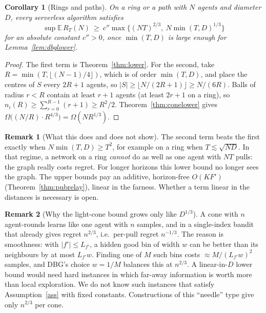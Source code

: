 \documentclass[11pt]{article}
\newtheorem{corollary}[theorem]{Corollary}
\theoremstyle{definition}
\newtheorem{remark}{Remark}
\newcommand{\E}{\mathbb{E}}
\begin{document}
\begin{corollary}[Rings and paths]\label{cor:ringlower}
On a ring or a path with $N$ agents and diameter $D$, every serverless algorithm satisfies
\[
\sup\E\,R_T(N)\ \ge\ c''\max\Big\{(NT)^{2/3},\ N\min(T,D)^{1/3}\Big\}
\]
for an absolute constant $c''>0$, once $\min(T,D)$ is large enough for Lemma~\ref{lem:dbglower}.
\end{corollary}
\begin{proof}
The first term is Theorem~\ref{thm:lower}. For the second, take $R=\min(T,\lfloor(N-1)/4\rfloor)$, which is of order
$\min(T,D)$, and place the centres of $S$ every $2R+1$ agents, so $|S|\ge\lfloor N/(2R+1)\rfloor\ge N/(6R)$. Balls of radius
$r<R$ contain at least $r+1$ agents (at least $2r+1$ on a ring), so $n_i(R)\ge\sum_{r=0}^{R-1}(r+1)\ge R^2/2$.
Theorem~\ref{thm:conelower} gives $\Omega\big((N/R)\cdot R^{4/3}\big)=\Omega(NR^{1/3})$.
\end{proof}

\begin{remark}[What this does and does not show]\label{rem:conelower}
The second term beats the first exactly when $N\min(T,D)\ge T^2$, for example on a ring when $T\lesssim\sqrt{ND}$. In
that regime, a network on a ring \emph{cannot} do as well as one agent with $NT$ pulls: the graph really costs regret.
For longer horizons this lower bound no longer sees the graph. The upper bounds pay an additive, horizon-free
$O(KF')$ (Theorem~\ref{thm:pubrelay}), linear in the farness. Whether a term linear in the distances is necessary is
open.
\end{remark}

\begin{remark}[Why the light-cone bound grows only like $D^{1/3}$]
A cone with $n$ agent-rounds learns like one agent with $n$ samples, and in a single-index bandit that already gives
regret $n^{2/3}$, i.e.\ per-pull regret $n^{-1/3}$. The reason is smoothness: with $|f'|\le L_{f'}$, a hidden good bin of
width $w$ can be better than its neighbours by at most $L_{f'}w$. Finding one of $M$ such bins costs $\approx M/(L_{f'}w)^2$
samples, and DBG's choice $w=1/M$ balances this at $n^{2/3}$. A linear-in-$D$ lower bound would need hard instances in
which far-away information is worth more than local exploration. We do not know such instances that satisfy
Assumption~\ref{ass} with fixed constants. Constructions of this ``needle'' type give only $n^{2/3}$ per cone.
\end{remark}

\end{document}
